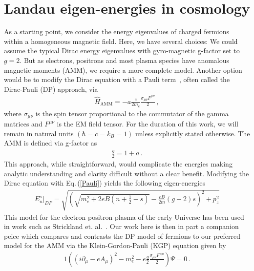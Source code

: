 \documentclass[twocolumn,preprintnumbers,amsmath,amssymb]{revtex4-2}
\newcommand{\req}[1]{Eq.\,({\ref{#1}})}
\begin{document}
\section{Landau eigen-energies in cosmology}\label{sec:Landau}
As a starting point, we consider the energy eigenvalues of charged fermions within a homogeneous magnetic field. Here, we have several choices: We could assume the typical Dirac energy eigenvalues with gyro-magnetic g-factor set to $g=2$. But as electrons, positrons and most plasma species have anomalous magnetic moments (AMM), we require a more complete model. Another option would be to modify the Dirac equation with a Pauli term~\cite{thaller2013dirac}, often called the Dirac-Pauli (DP) approach, via
\begin{align}
 \label{Pauli} \hat{H}_{\mathrm{AMM}} = -a\frac{e}{2m_{e}}\frac{\sigma_{\mu\nu}F^{\mu\nu}}{2}\,,
\end{align}
where $\sigma_{\mu\nu}$ is the spin tensor proportional to the commutator of the gamma matrices and $F^{\mu\nu}$ is the EM field tensor. For the duration of this work, we will remain in natural units $(\hbar=c=k_{B}=1)$ unless explicitly stated otherwise. The AMM is defined via g-factor as
\begin{align}
 \label{AMM} \frac{g}{2}=1+a\,.
\end{align}
This approach, while straightforward, would complicate the energies making analytic understanding and clarity difficult without a clear benefit. Modifying the Dirac equation with \req{Pauli} yields the following eigen-energies
\begin{align}
 \label{DPEnergy} E_{n}^{s}\vert_{DP}=\sqrt{\left(\sqrt{m_{e}^{2}+2eB\left(n+\frac{1}{2}-s\right)}-\frac{eB}{2m}(g-2)s\right)^{2}+p_{z}^{2}}
\end{align}
This model for the electron-positron plasma of the early Universe has been used in work such as Strickland et. al.~\cite{Strickland:2012vu}. Our work here is then in part a companion peice which compares and contrasts the DP model of fermions to our preferred model for the AMM via the Klein-Gordon-Pauli (KGP) equation given by
\begin{alignat}{1}
 \label{KGP} \left(\left(i\partial_{\mu}-eA_{\mu}\right)^{2}-m_{e}^{2}-e\frac{g}{2}\frac{\sigma_{\mu\nu}F^{\mu\mu}}{2}\right)\Psi=0\,.
\end{alignat}
\end{document}
